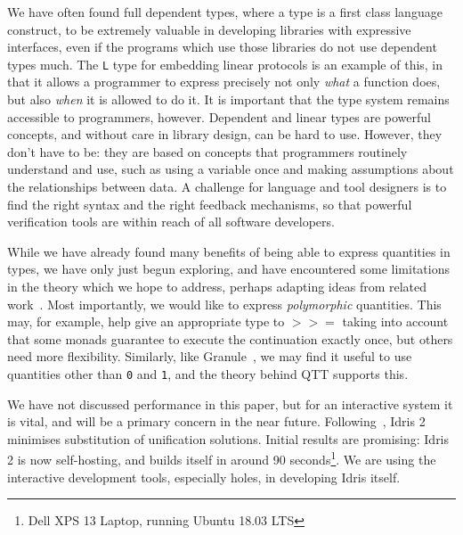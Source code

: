 We have often found full dependent types, where a type is a first class
language construct, to be extremely valuable in developing libraries with
expressive interfaces, even if the programs which use those libraries do not
use dependent types much. The \texttt{L} type for embedding linear protocols
is an example of this, in that it allows a programmer to express precisely
not only \emph{what} a function does, but also \emph{when} it is allowed to
do it. It is important that the type system remains accessible to programmers,
however. Dependent and linear types are powerful concepts, and without care in
library design, can be hard to use. However, they don't have to be: they are based on
concepts that programmers routinely understand and use, such as using a
variable once and making assumptions about the relationships between data. 
A challenge for language and tool designers
is to find the right syntax and the right feedback mechanisms, so that
powerful verification tools are within reach of all software developers.


While we have already found many benefits of being able to express
quantities in types, we have only just begun exploring, and have encountered
some limitations in the theory which we hope to address, perhaps adapting
ideas from related work~\cite{granulepopl}. Most
importantly, we would like to express \emph{polymorphic}
quantities. This may, for example, help give an appropriate type to
$\mathtt{>>=}$ taking into account that some monads guarantee to execute
the continuation exactly once, but others need more flexibility. Similarly,
like Granule~\cite{granule}, we may find it useful to use quantities other
than \texttt{0} and \texttt{1}, and the theory behind QTT supports
this.

We have not discussed performance in this paper, but for an interactive
system it is vital, and will be a primary concern in the near future.
Following~\cite{kovacs-smalltt}, Idris 2 minimises substitution of unification
solutions. Initial results are promising: Idris 2 is now self-hosting, and
builds itself in around 90 seconds\footnote{Dell XPS 13 Laptop, running Ubuntu 18.03 LTS}.
We are using the interactive development tools, especially holes, in developing
Idris itself.


